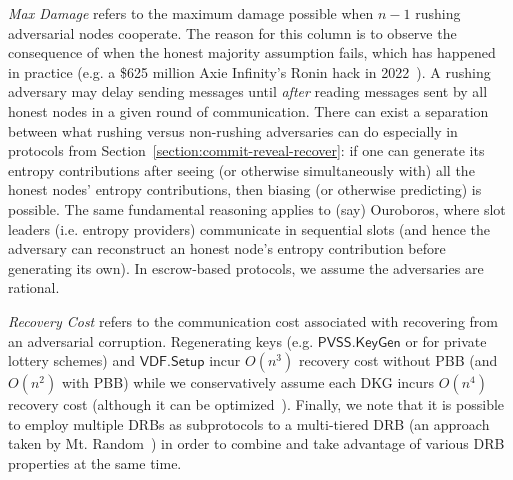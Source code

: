 \textit{Max Damage} refers to the maximum damage possible when $n - 1$ rushing~\cite{gennaro1999secure}  adversarial nodes cooperate.
The reason for this column is to observe the consequence of when the honest majority assumption fails, which has happened in practice (e.g. a \$625 million Axie Infinity's Ronin hack in 2022~\cite{scharfman2023decentralized}). 
A rushing adversary may delay sending messages until \textit{after} reading messages sent by all honest nodes in a given round of communication.
There can exist a separation between what rushing versus non-rushing adversaries can do especially in protocols from Section~\ref{section:commit-reveal-recover}: if one can generate its entropy contributions after seeing (or otherwise simultaneously with) all the honest nodes' entropy contributions, then biasing (or otherwise predicting) is possible.
The same fundamental reasoning applies to (say) Ouroboros, where slot leaders (i.e. entropy providers) communicate in sequential slots (and hence the adversary can reconstruct an honest node's entropy contribution before generating its own).
In escrow-based protocols, we assume the adversaries are rational.

\textit{Recovery Cost} refers to the communication cost associated with recovering from an adversarial corruption.
Regenerating keys (e.g. $\mathsf{PVSS.KeyGen}$ or for private lottery schemes) and $\mathsf{VDF.Setup}$ incur $O(n^3)$ recovery cost without PBB (and $O(n^2)$ with PBB) while we conservatively assume each DKG incurs $O(n^4)$ recovery cost (although it can be optimized~\cite{gurkan2021aggregatable}).
Finally, we note that it is possible to employ multiple DRBs as subprotocols to a multi-tiered DRB (an approach taken by Mt. Random~\cite{cascudo2021mt}) in order to combine and take advantage of various DRB properties at the same time.

